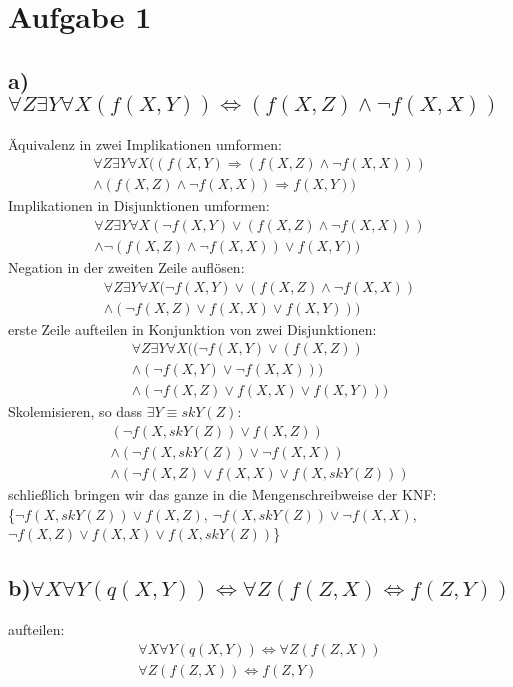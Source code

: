 \documentclass[10pt,a4paper]{article}
\begin{document}
\section*{Aufgabe 1}
	\subsection*{a) $\forall Z \exists Y \forall X (f(X, Y))\Leftrightarrow (f(X, Z) \wedge \neg f(X, X)) $}
	Äquivalenz in zwei Implikationen umformen:
	\begin{gather*}
		\forall Z \exists Y \forall X ((f(X, Y) \Rightarrow (f(X,Z) \wedge \neg f(X, X))) \\ \wedge 
		(f(X,Z) \wedge \neg f(X, X)) \Rightarrow f(X, Y))
	\end{gather*}
	Implikationen in Disjunktionen umformen:
	\begin{gather*}
		\forall Z \exists Y \forall X (\neg f(X, Y) \vee (f(X,Z) \wedge \neg f(X, X))) \\ 
		\wedge 
		\neg (f(X,Z) \wedge \neg f(X, X)) \vee f(X, Y))
	\end{gather*}
	Negation in der zweiten Zeile auflösen:
	\begin{gather*}
		\forall Z \exists Y \forall X (\neg f(X, Y) \vee (f(X,Z)
		\wedge \neg f(X, X)) 
		\\ \wedge 
		(\neg f(X,Z) \vee f(X, X) \vee f(X, Y)))
	\end{gather*}	
	erste Zeile aufteilen in Konjunktion von zwei Disjunktionen:
	\begin{gather*}
		\forall Z \exists Y \forall X 
		((\neg f(X, Y) \vee (f(X,Z)) \\
		\wedge (\neg f(X, Y) \vee \neg f(X, X))) \\  
		\wedge 
		(\neg f(X,Z) \vee f(X, X) \vee f(X, Y)))
	\end{gather*}
	Skolemisieren, so dass $\exists Y \equiv skY(Z)$:
	\begin{gather*}
		(\neg f(X, skY(Z)) \vee f(X,Z)) \\
		\wedge (\neg f(X, skY(Z)) \vee \neg f(X, X)) \\  
		\wedge 
		(\neg f(X,Z) \vee f(X, X) \vee f(X, skY(Z)))
	\end{gather*}
	schließlich bringen wir das ganze in die Mengenschreibweise der KNF:\\
	\{$\neg f(X, skY(Z)) \vee f(X,Z)$, $\neg f(X, skY(Z)) \vee \neg f(X, X)$, $\neg f(X,Z) \vee f(X, X) \vee f(X, skY(Z))$\}
	
	
	\subsection*{b)$ \forall X \forall Y (q(X, Y)) \Leftrightarrow \forall Z (f(Z, X) \Leftrightarrow f(Z, Y))$}
	aufteilen:
	\begin{gather*}
		\forall X \forall Y (q(X, Y)) \Leftrightarrow \forall Z (f(Z, X)) \\
		\forall Z (f(Z, X))	\Leftrightarrow f(Z, Y)
	\end{gather*}
	
\end{document}
